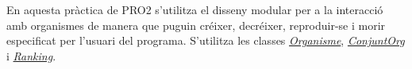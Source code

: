 En aquesta pràctica de P\-R\-O2 s'utilitza el disseny modular per a la interacció amb organismes de manera que puguin créixer, decréixer, reproduir-\/se i morir especificat per l'usuari del programa. S'utilitza les classes {\itshape \hyperlink{class_organisme}{Organisme}}, {\itshape \hyperlink{class_conjunt_org}{Conjunt\-Org}} i {\itshape \hyperlink{class_ranking}{Ranking}}. 